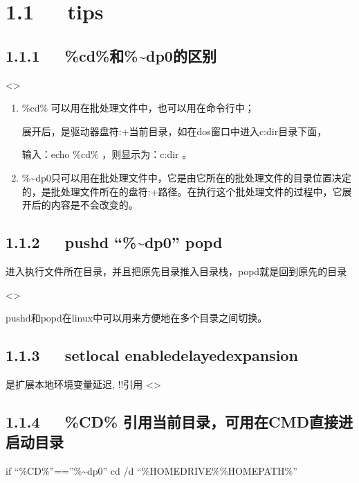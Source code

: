\documentclass[letterpaper,12pt,english]{sphinxmanual}
\begin{document}
\section{1.1   tips}
\label{\detokenize{001software/002usage/bat:tips}}

\subsection{1.1.1   \%cd\%和\%\textasciitilde{}dp0的区别}
\label{\detokenize{001software/002usage/bat:cd-dp0}}
<>
\begin{enumerate}
%
\item {} 
\%cd\% 可以用在批处理文件中，也可以用在命令行中；

展开后，是驱动器盘符:+当前目录，如在dos窗口中进入c:dir目录下面，

输入：echo \%cd\% ，则显示为：c:dir 。

\item {} 
\%\textasciitilde{}dp0只可以用在批处理文件中，它是由它所在的批处理文件的目录位置决定的，是批处理文件所在的盘符:+路径。在执行这个批处理文件的过程中，它展开后的内容是不会改变的。

\end{enumerate}


\subsection{1.1.2   pushd “\%\textasciitilde{}dp0” popd}
\label{\detokenize{001software/002usage/bat:pushd-dp0-popd}}
进入执行文件所在目录，并且把原先目录推入目录栈，popd就是回到原先的目录

<>

pushd和popd在linux中可以用来方便地在多个目录之间切换。


\subsection{1.1.3   setlocal enabledelayedexpansion}
\label{\detokenize{001software/002usage/bat:setlocal-enabledelayedexpansion}}
是扩展本地环境变量延迟, !!引用
<>


\subsection{1.1.4   \%CD\% 引用当前目录，可用在CMD直接进启动目录}
\label{\detokenize{001software/002usage/bat:cd-cmd}}
if “\%CD\%”==”\%\textasciitilde{}dp0” cd /d “\%HOMEDRIVE\%\%HOMEPATH\%”
\end{document}
